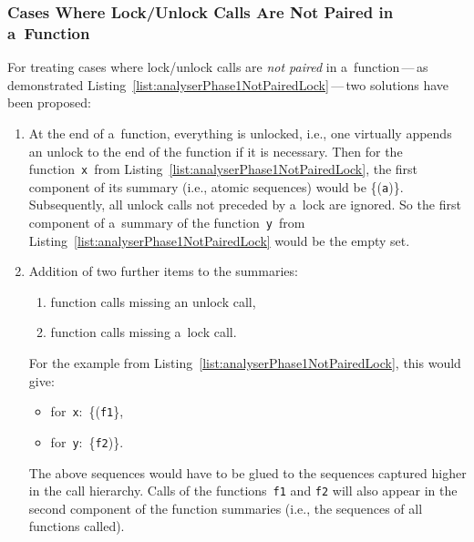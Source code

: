 \subsubsection{Cases Where Lock/Unlock Calls Are Not Paired in a~Function}

For treating cases where lock/unlock calls are \emph{not paired} in
a~function\,---\,as demonstrated
Listing~\ref{list:analyserPhase1NotPairedLock}\,---\,two solutions
have been proposed:
\begin{enumerate}
    \item
        At the end of a~function, everything is unlocked, i.e., one
        virtually appends an unlock to the end of the function if it
        is necessary. Then for the function~\texttt{x}~from
        Listing~\ref{list:analyserPhase1NotPairedLock}, the first component
        of its summary (i.e., atomic sequences) would be \{(\texttt{a})\}.
        Subsequently, all unlock calls not preceded by a~lock are
        ignored. So the first component of a~summary of the
        function~\texttt{y}~from
        Listing~\ref{list:analyserPhase1NotPairedLock} would be the empty
        set.

    \item
        Addition of two further items to the summaries:
        \begin{enumerate}[label={(\alph*)}]
            \item
                function calls missing an unlock call,

            \item
                function calls missing a~lock call.
        \end{enumerate}
        For the example from Listing~\ref{list:analyserPhase1NotPairedLock},
        this would give:
        \begin{itemize}
            \item
                for~\texttt{x}:~\{(\texttt{f1}\},

            \item
                for~\texttt{y}:~\{\texttt{f2})\}.
        \end{itemize}
        The above sequences would have to be glued to the sequences
        captured higher in the call hierarchy. Calls of the
        functions~\texttt{f1} and \texttt{f2} will also appear in
        the second component of the function summaries (i.e., the sequences
        of all functions called).
\end{enumerate}

